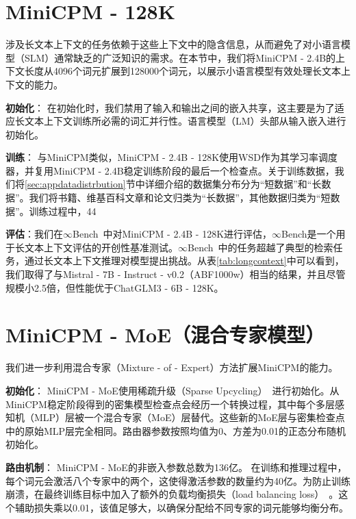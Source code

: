 \section{MiniCPM - 128K}
涉及长文本上下文的任务依赖于这些上下文中的隐含信息，从而避免了对小语言模型（SLM）通常缺乏的广泛知识的需求。在本节中，我们将MiniCPM - 2.4B的上下文长度从4096个词元扩展到128000个词元，以展示小语言模型有效处理长文本上下文的能力。

\textbf{初始化}：
在初始化时，我们禁用了输入和输出之间的嵌入共享，这主要是为了适应长文本上下文训练所必需的词汇并行性。语言模型（LM）头部从输入嵌入进行初始化。

\textbf{训练}：
与MiniCPM类似，MiniCPM - 2.4B - 128K使用WSD作为其学习率调度器，并复用MiniCPM - 2.4B稳定训练阶段的最后一个检查点。关于训练数据，我们将\ref{sec:appdatadistrbution}节中详细介绍的数据集分布分为“短数据”和“长数据”。我们将书籍、维基百科文章和论文归类为“长数据”，其他数据归类为“短数据”。训练过程中，44%

\textbf{评估}：我们在$\infty$Bench~\citep{zhang2024infty}中对MiniCPM - 2.4B - 128K进行评估，$\infty$Bench是一个用于长文本上下文评估的开创性基准测试。$\infty$Bench~\citep{zhang2024infty}中的任务超越了典型的检索任务，通过长文本上下文推理对模型提出挑战。从表\ref{tab:longcontext}中可以看到，我们取得了与Mistral - 7B - Instruct - v0.2（ABF1000w）相当的结果，并且尽管规模小2.5倍，但性能优于ChatGLM3 - 6B - 128K。 

\section{MiniCPM - MoE（混合专家模型）}
我们进一步利用混合专家（Mixture - of - Expert）方法扩展MiniCPM的能力。

\textbf{初始化}：
MiniCPM - MoE使用稀疏升级（Sparse Upcycling）~\citep{komatsuzaki2022sparse}进行初始化。从MiniCPM稳定阶段得到的密集模型检查点会经历一个转换过程，其中每个多层感知机（MLP）层被一个混合专家（MoE）层替代。这些新的MoE层与密集检查点中的原始MLP层完全相同。路由器参数按照均值为0、方差为0.01的正态分布随机初始化。

\textbf{路由机制}：
MiniCPM - MoE的非嵌入参数总数为136亿。
在训练和推理过程中，每个词元会激活八个专家中的两个，这使得激活参数的数量约为40亿。为防止训练崩溃，在最终训练目标中加入了额外的负载均衡损失（load balancing loss）~\citep{fedus2022switch}。这个辅助损失乘以0.01，该值足够大，以确保分配给不同专家的词元能够均衡分布。

